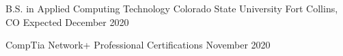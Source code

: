 



\begin{cventries}
  \cventry
    {B.S. in Applied Computing Technology} %
    {Colorado State University} %
    {Fort Collins, CO} %
    {Expected December 2020} %
    {}

  \certentry
    {CompTia Network+} %
    {Professional Certifications} %
    {November 2020} %
	{ }
	{ }
\end{cventries}
